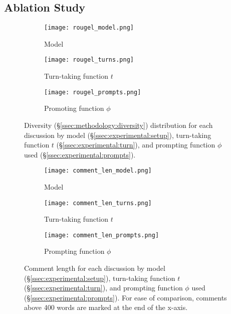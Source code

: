 \subsection{Ablation Study}
\label{ssec:results:ablation}

\begin{figure*}[t]
    \begin{subfigure}{0.32\linewidth}
        \texttt{[image: rougel\_model.png]}
        \caption{Model}
        \label{fig:rougel_model}
    \end{subfigure}%
    \hfill
    \begin{subfigure}{0.32\linewidth}
        \texttt{[image: rougel\_turns.png]}
        \caption{Turn-taking function $t$}
        \label{fig:rougel_turns}
    \end{subfigure}%
    \hfill
    \begin{subfigure}{0.32\linewidth}
        \texttt{[image: rougel\_prompts.png]}
        \caption{Promoting function $\phi$}
        \label{fig:rougel_prompts}
    \end{subfigure}%

    \caption{Diversity (\S\ref{ssec:methodology:diversity}) distribution for each discussion by model (\S\ref{ssec:experimental:setup}), turn-taking function $t$ (\S\ref{ssec:experimental:turn}), and prompting function $\phi$ used (\S\ref{ssec:experimental:prompts}).}
    \label{fig:diversity}
\end{figure*}

\begin{figure*}[t]
    \begin{subfigure}{0.32\linewidth}
        \texttt{[image: comment\_len\_model.png]}
        \caption{Model}
        \label{fig:comment_length_model}
    \end{subfigure}%
    \hfill
    \begin{subfigure}{0.32\linewidth}
        \texttt{[image: comment\_len\_turns.png]}
        \caption{Turn-taking function $t$}
        \label{fig:comment_length_turns}
    \end{subfigure}%
    \hfill
    \begin{subfigure}{0.32\linewidth}
        \texttt{[image: comment\_len\_prompts.png]}
        \caption{Prompting function $\phi$}
        \label{fig:comment_length_prompts}
    \end{subfigure}%

    \caption{Comment length for each discussion by model (\S\ref{ssec:experimental:setup}), turn-taking function $t$ (\S\ref{ssec:experimental:turn}), and prompting function $\phi$ used (\S\ref{ssec:experimental:prompts}). For ease of comparison, comments above 400 words are marked at the end of the x-axis.}
    \label{fig:comment_length}
\end{figure*}


